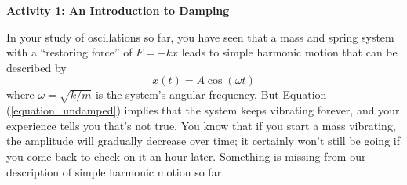 \bigskip
\textbf{Activity 1: An Introduction to Damping} 

In your study of oscillations so far, you have seen that a mass and spring system with a ``restoring force'' of $F=-kx$ leads to simple harmonic motion that can be described by
\begin{equation}
x(t)=A\cos (\omega t)
\label{equation_undamped}
\end{equation}
where $\omega = \sqrt{k/m}$ is the system's angular frequency.
But Equation (\ref{equation_undamped}) implies that the system keeps vibrating forever, and your experience tells you that's not true.  You know that if you start a mass vibrating, the amplitude will gradually decrease over time; it certainly won't still be going if you come back to check on it an hour later.  Something is missing from our description of simple harmonic motion so far.


